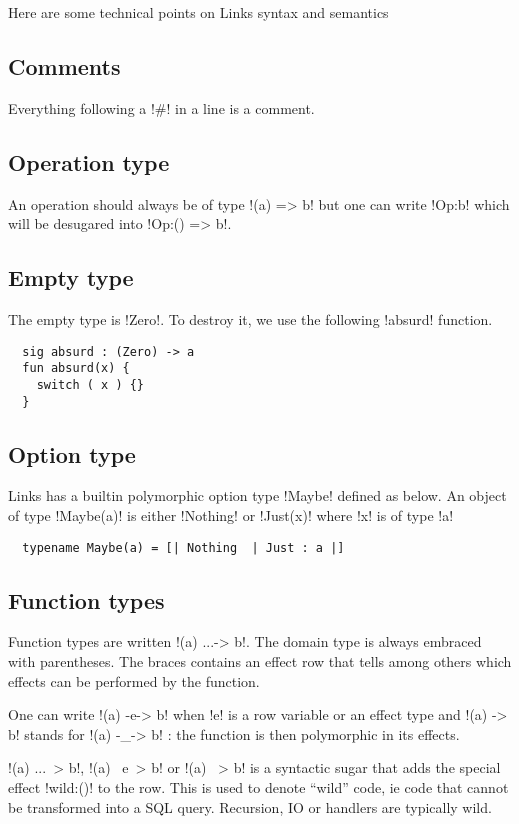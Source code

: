 \documentclass[11pt, nonacm=true, language=french, language=english]{acmart}
\begin{document}
Here are some technical points on Links syntax and semantics

\subsection{Comments}
\label{sec:comments}
Everything following a !#! in a line is a comment.

\subsection{Operation type}
\label{sec:operation-type}
An operation should always be of type !(a) => b! but one can write !Op:b! which will be desugared into !Op:() => b!.

\subsection{Empty type}
\label{sec:tech:zero}
The empty type is !Zero!. To destroy it, we use the following !absurd! function.
\begin{lstlisting}
  sig absurd : (Zero) -> a
  fun absurd(x) {
    switch ( x ) {}
  }
\end{lstlisting}

\subsection{Option type}
\label{sec:tech:maybe}
Links has a builtin polymorphic option type !Maybe! defined as below. An object of type !Maybe(a)! is either !Nothing! or !Just(x)! where !x! is of type !a!
\begin{lstlisting}
  typename Maybe(a) = [| Nothing  | Just : a |]
\end{lstlisting}

\subsection{Function types}
Function types are written !(a) {...}-> b!. The domain type is always embraced with parentheses. The braces contains an effect row that tells among others which effects can be performed by the function.

One can write !(a) -e-> b! when !e! is a row variable or an effect type and !(a) -> b! stands for !(a) -_-> b! : the function is then polymorphic in its effects.

!(a) {...}~> b!, !(a) ~e~> b! or !(a) ~> b! is a syntactic sugar that adds the special effect !wild:()! to the row. This is used to denote ``wild'' code, ie code that cannot be transformed into a SQL query. Recursion, IO or handlers are typically wild. \cite{}
\end{document}
